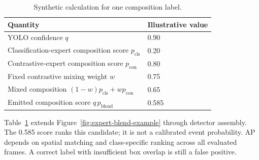 \begin{table}[htbp]
\centering
\caption{Synthetic calculation for one composition label.}
\label{tab:worked-score}
\begin{singlespace}
\begin{tabularx}{\textwidth}{@{}Xl@{}}
\toprule
\textbf{Quantity} & \textbf{Illustrative value}\\
\midrule
YOLO confidence \(q\) & 0.90\\
Classification-expert composition score \(p_{\mathrm{cls}}\) & 0.20\\
Contrastive-expert composition score \(p_{\mathrm{con}}\) & 0.80\\
Fixed contrastive mixing weight \(w\) & 0.75\\
Mixed composition \((1-w)p_{\mathrm{cls}}+wp_{\mathrm{con}}\) & 0.65\\
Emitted composition score \(q\,p_{\mathrm{blend}}\) & 0.585\\
\bottomrule
\end{tabularx}
\end{singlespace}
\end{table}

Table~\ref{tab:worked-score} extends Figure~\ref{fig:expert-blend-example} through detector assembly. The 0.585 score ranks this candidate; it is not a calibrated event probability. AP depends on spatial matching and class-specific ranking across all evaluated frames. A correct label with insufficient box overlap is still a false positive.
